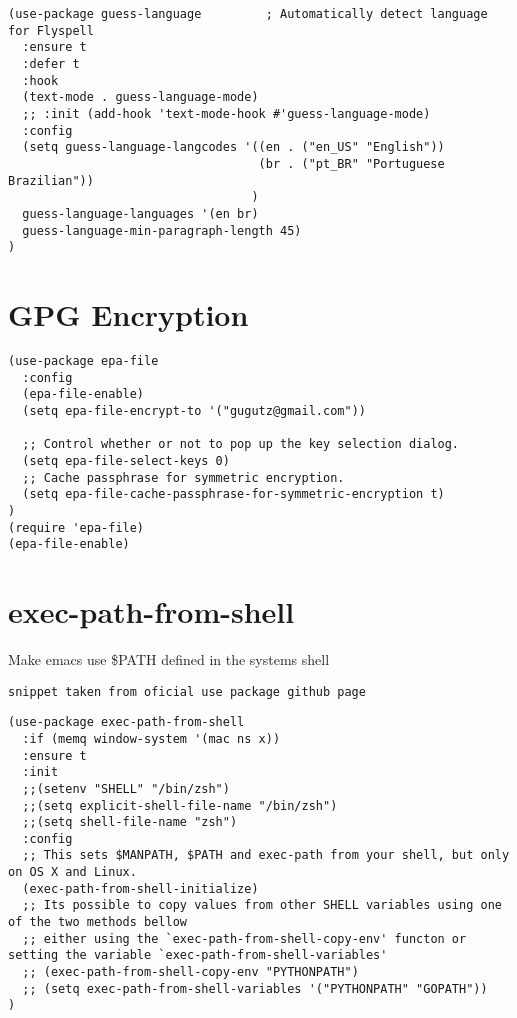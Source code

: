 \documentclass[11pt]{article}
\begin{document}
\begin{verbatim}
(use-package guess-language         ; Automatically detect language for Flyspell
  :ensure t
  :defer t
  :hook
  (text-mode . guess-language-mode)
  ;; :init (add-hook 'text-mode-hook #'guess-language-mode)
  :config
  (setq guess-language-langcodes '((en . ("en_US" "English"))
                                   (br . ("pt_BR" "Portuguese Brazilian"))
                                  )
  guess-language-languages '(en br)
  guess-language-min-paragraph-length 45)
)
\end{verbatim}


\section*{GPG Encryption}
\label{sec:orgb2246d1}

\begin{verbatim}
(use-package epa-file
  :config
  (epa-file-enable)
  (setq epa-file-encrypt-to '("gugutz@gmail.com"))

  ;; Control whether or not to pop up the key selection dialog.
  (setq epa-file-select-keys 0)
  ;; Cache passphrase for symmetric encryption.
  (setq epa-file-cache-passphrase-for-symmetric-encryption t)
)
(require 'epa-file)
(epa-file-enable)
\end{verbatim}

\section*{exec-path-from-shell}
\label{sec:org478b65f}

Make emacs use \$PATH defined in the systems shell

\begin{verbatim}
snippet taken from oficial use package github page
\end{verbatim}

\begin{verbatim}
(use-package exec-path-from-shell
  :if (memq window-system '(mac ns x))
  :ensure t
  :init
  ;;(setenv "SHELL" "/bin/zsh")
  ;;(setq explicit-shell-file-name "/bin/zsh")
  ;;(setq shell-file-name "zsh")
  :config
  ;; This sets $MANPATH, $PATH and exec-path from your shell, but only on OS X and Linux.
  (exec-path-from-shell-initialize)
  ;; Its possible to copy values from other SHELL variables using one of the two methods bellow
  ;; either using the `exec-path-from-shell-copy-env' functon or setting the variable `exec-path-from-shell-variables'
  ;; (exec-path-from-shell-copy-env "PYTHONPATH")
  ;; (setq exec-path-from-shell-variables '("PYTHONPATH" "GOPATH"))
)
\end{verbatim}
\end{document}

